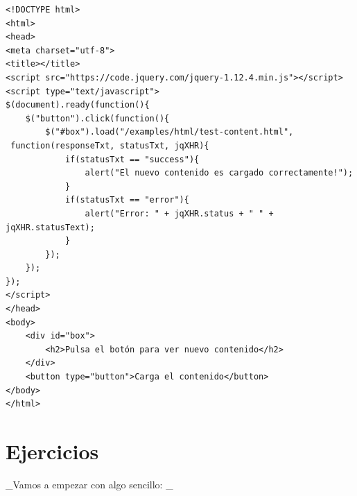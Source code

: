\documentclass[a4paper, oneside]{article}
\begin{document}
\begin{verbatim}
<!DOCTYPE html>
<html>
<head>
<meta charset="utf-8">
<title></title>
<script src="https://code.jquery.com/jquery-1.12.4.min.js"></script>
<script type="text/javascript">
$(document).ready(function(){
    $("button").click(function(){
        $("#box").load("/examples/html/test-content.html",
 function(responseTxt, statusTxt, jqXHR){
            if(statusTxt == "success"){
                alert("El nuevo contenido es cargado correctamente!");
            }
            if(statusTxt == "error"){
                alert("Error: " + jqXHR.status + " " + jqXHR.statusText);
            }
        });
    });
});
</script>
</head>
<body>
    <div id="box">
        <h2>Pulsa el botón para ver nuevo contenido</h2>
    </div>
    <button type="button">Carga el contenido</button>
</body>
</html>                                		
\end{verbatim}

\section{Ejercicios}
\label{sec:org5f4ca52}

\_Vamos a empezar con algo sencillo: \_
\end{document}
